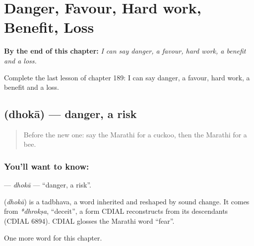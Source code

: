 
\chapter{Danger, Favour, Hard work, Benefit, Loss}
\label{ch:mr-danger-favour-hard-work-benefit-loss}

\begin{chapteropening}
\textbf{By the end of this chapter:} \emph{I can say danger, a favour, hard work, a benefit and a loss.}

Complete the last lesson of chapter 189: I can say danger, a favour, hard work, a benefit and a loss.
\end{chapteropening}

\section[\texorpdfstring{\mr{धोका} (dhokā)}{धोका (dhokā)}]{ (dhokā) — danger, a risk}

\label{lesson:MR-C189-dhoka}



\begin{quote}
Before the new one: say the Marathi for a cuckoo, then the Marathi for a bee.
\end{quote}

\subsection*{You'll want to know: }
\textbf{} — \emph{dhokā} — \textquotedblleft{}danger, a risk\textquotedblright{}.

\begin{cousinweb}
\textbf{} (\emph{dhokā}) is a tadbhava, a word inherited and reshaped by sound change. It comes from \emph{*dhrokṣa}, \textquotedblleft{}deceit\textquotedblright{}, a form CDIAL reconstructs from its descendants (CDIAL 6894). CDIAL glosses the Marathi word \textquotedblleft{}fear\textquotedblright{}.
\end{cousinweb}

\begin{grammarlens}[title={What you've built}]
One more word for this chapter.
\end{grammarlens}

